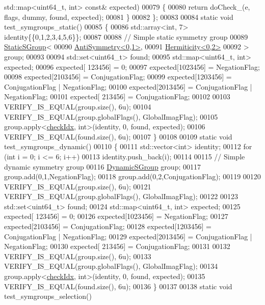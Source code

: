 \begin{DoxyCode}
      std::map<uint64\_t, int> \textcolor{keyword}{const}& expected)
00079   \{
00080     \textcolor{keywordflow}{return} doCheck\_(e, flags, dummy, found, expected);
00081   \}
00082 \};
00083 
00084 \textcolor{keyword}{static} \textcolor{keywordtype}{void} test\_symgroups\_static()
00085 \{
00086   std::array<int, 7> identity\{\{0,1,2,3,4,5,6\}\};
00087 
00088   \textcolor{comment}{// Simple static symmetry group}
00089   \hyperlink{class_eigen_1_1_static_s_group}{StaticSGroup}<
00090     \hyperlink{struct_eigen_1_1_anti_symmetry}{AntiSymmetry<0,1>},
00091     \hyperlink{struct_eigen_1_1_hermiticity}{Hermiticity<0,2>}
00092   > group;
00093 
00094   std::set<uint64\_t> found;
00095   std::map<uint64\_t, int> expected;
00096   expected[ 123456] = 0;
00097   expected[1023456] = NegationFlag;
00098   expected[2103456] = ConjugationFlag;
00099   expected[1203456] = ConjugationFlag | NegationFlag;
00100   expected[2013456] = ConjugationFlag | NegationFlag;
00101   expected[ 213456] = ConjugationFlag;
00102 
00103   VERIFY\_IS\_EQUAL(group.size(), 6u);
00104   VERIFY\_IS\_EQUAL(group.globalFlags(), GlobalImagFlag);
00105   group.apply<\hyperlink{structcheck_idx}{checkIdx}, \textcolor{keywordtype}{int}>(identity, 0, found, expected);
00106   VERIFY\_IS\_EQUAL(found.size(), 6u);
00107 \}
00108 
00109 \textcolor{keyword}{static} \textcolor{keywordtype}{void} test\_symgroups\_dynamic()
00110 \{
00111   std::vector<int> identity;
00112   \textcolor{keywordflow}{for} (\textcolor{keywordtype}{int} i = 0; i <= 6; i++)
00113     identity.push\_back(i);
00114 
00115   \textcolor{comment}{// Simple dynamic symmetry group}
00116   \hyperlink{class_eigen_1_1_dynamic_s_group}{DynamicSGroup} group;
00117   group.add(0,1,NegationFlag);
00118   group.add(0,2,ConjugationFlag);
00119 
00120   VERIFY\_IS\_EQUAL(group.size(), 6u);
00121   VERIFY\_IS\_EQUAL(group.globalFlags(), GlobalImagFlag);
00122 
00123   std::set<uint64\_t> found;
00124   std::map<uint64\_t, int> expected;
00125   expected[ 123456] = 0;
00126   expected[1023456] = NegationFlag;
00127   expected[2103456] = ConjugationFlag;
00128   expected[1203456] = ConjugationFlag | NegationFlag;
00129   expected[2013456] = ConjugationFlag | NegationFlag;
00130   expected[ 213456] = ConjugationFlag;
00131 
00132   VERIFY\_IS\_EQUAL(group.size(), 6u);
00133   VERIFY\_IS\_EQUAL(group.globalFlags(), GlobalImagFlag);
00134   group.apply<\hyperlink{structcheck_idx}{checkIdx}, \textcolor{keywordtype}{int}>(identity, 0, found, expected);
00135   VERIFY\_IS\_EQUAL(found.size(), 6u);
00136 \}
00137 
00138 \textcolor{keyword}{static} \textcolor{keywordtype}{void} test\_symgroups\_selection()

\end{DoxyCode}
